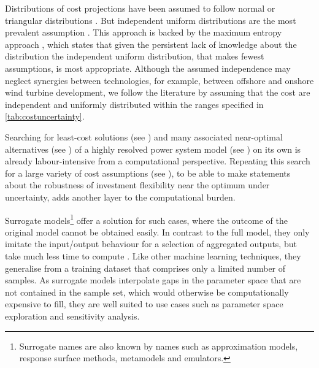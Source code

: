 
Distributions of cost projections have been assumed to follow normal
\cite{mavromatidis_uncertainty_2018} or triangular distributions
\cite{li_using_2020}. But independent uniform distributions are the most
prevalent assumption
\cite{moret_characterization_2017,moret_robust_2016,shirizadeh_how_2019,trondle_trade-offs_2020,pilpola_analyzing_2020,Li2017,Trutnevyte2013,lopion_cost_2019}.
This approach is backed by the maximum entropy approach
\cite{trondle_trade-offs_2020}, which states that given the persistent lack of knowledge
about the distribution the independent uniform distribution, that makes fewest
assumptions, is most appropriate. Although the assumed independence may neglect
synergies between technologies, for example, between offshore and onshore wind
turbine development, we follow the literature by assuming that the cost are
independent and uniformly distributed within the ranges specified in
\cref{tab:costuncertainty}.



Searching for least-cost solutions (see ) and many associated near-optimal alternatives (see ) of a highly resolved power system model (see ) on its own
is already labour-intensive from a computational perspective.
Repeating this search for a large variety of cost assumptions (see ),
to be able to make statements about the robustness of
investment flexibility near the optimum under uncertainty,
adds another layer to the computational burden.


Surrogate models\footnote{Surrogate names are also known by names such as approximation models, response surface methods, metamodels and emulators.}
offer a solution for such cases, where the outcome of the
original model cannot be obtained easily.
In contrast to the full model, they only imitate the input/output behaviour for a selection of aggregated outputs, but take much less time to compute \cite{palar_multi-fidelity_2016}.
Like other machine learning techniques, they generalise from a
training dataset that comprises only a limited number of samples.
As surrogate models interpolate gaps in the parameter space that are not contained in the sample set,
which would otherwise be computationally expensive to fill,
they are well suited to use cases such as parameter space exploration and sensitivity analysis.


